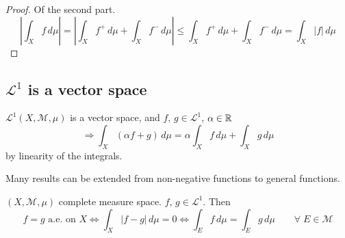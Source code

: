\begin{proof}
    Of the second part.
    \[
        \left| \int_X f \, d\mu \right| = \left| \int_X f^+ \, d\mu + \int_X f^- \, d\mu\right| \leq \int_X f^+ \, d\mu + \int_X f^- \, d\mu = \int_X |f| \, d\mu  
    \]
\end{proof}
\subsection{\texorpdfstring{\(\mathcal{L}^1\)}{L1} is a vector space}
\begin{proposition}
    \(\mathcal{L}^1(X, \mathcal{M}, \mu)\) is a vector space, and \(f, \, g \in \mathcal{L}^1\), \(\alpha \in \mathbb{R}\)
    \[
        \Rightarrow \int_X \left(\alpha f + g \right) \, d\mu = \alpha \int_X f \, d\mu + \int_X g \, d\mu 
    \]  
    by linearity of the integrals.
\end{proposition}

Many results can be extended from non-negative functions to general functions.

\begin{theorem}
    \((X, \mathcal{M}, \mu)\) complete measure space. \(f\), \(g \in \mathcal{L}^1\). Then
    \[
        f= g \text{ a.e. on } X \Leftrightarrow \int_X |f-g| \, d\mu =0 \Leftrightarrow \int_E f \, d\mu = \int_E g \, d\mu \qquad \forall \; E \in \mathcal{M} 
    \]
\end{theorem}
